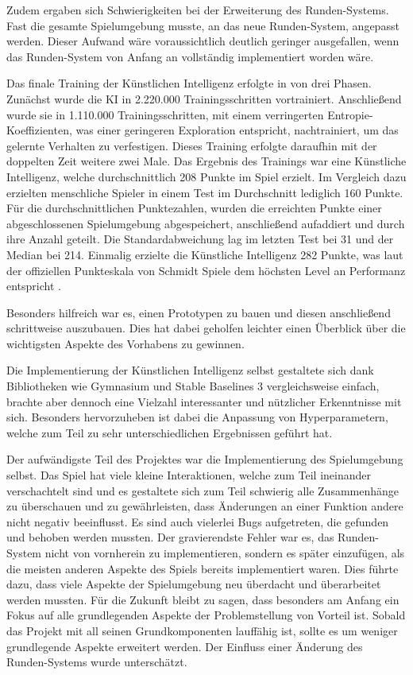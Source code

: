 Zudem ergaben sich Schwierigkeiten bei der Erweiterung des Runden-Systems. Fast die gesamte Spielumgebung musste, an das neue Runden-System, angepasst werden. Dieser Aufwand wäre voraussichtlich deutlich geringer ausgefallen, wenn das Runden-System von Anfang an vollständig implementiert worden wäre.

Das finale Training der Künstlichen Intelligenz erfolgte in von drei Phasen. Zunächst wurde die KI in 2.220.000 Trainingsschritten vortrainiert. Anschließend wurde sie in 1.110.000 Trainingsschritten, mit einem verringerten Entropie-Koeffizienten, was einer geringeren Exploration entspricht, nachtrainiert, um das gelernte Verhalten zu verfestigen. Dieses Training erfolgte daraufhin mit der doppelten Zeit weitere zwei Male. Das Ergebnis des Trainings war eine Künstliche Intelligenz, welche durchschnittlich 208 Punkte im Spiel erzielt. Im Vergleich dazu erzielten menschliche Spieler in einem Test im Durchschnitt lediglich 160 Punkte. Für die durchschnittlichen Punktezahlen, wurden die erreichten Punkte einer abgeschlossenen Spielumgebung abgespeichert, anschließend aufaddiert und durch ihre Anzahl geteilt. Die Standardabweichung lag im letzten Test bei 31 und der Median bei 214. Einmalig erzielte die Künstliche Intelligenz 282 Punkte, was laut der offiziellen Punkteskala von Schmidt Spiele dem höchsten Level an Performanz entspricht \cite{noauthor_49340_ganz_schoen_clever_anleitung_final9_nodate}.

Besonders hilfreich war es, einen Prototypen zu bauen und diesen anschließend schrittweise auszubauen. Dies hat dabei geholfen leichter einen Überblick über die wichtigsten Aspekte des Vorhabens zu gewinnen. 

Die Implementierung der Künstlichen Intelligenz selbst gestaltete sich dank Bibliotheken wie Gymnasium und Stable Baselines 3 vergleichsweise einfach, brachte aber dennoch eine Vielzahl interessanter und nützlicher Erkenntnisse mit sich. Besonders hervorzuheben ist dabei die Anpassung von Hyperparametern, welche zum Teil zu sehr unterschiedlichen Ergebnissen geführt hat. 

Der aufwändigste Teil des Projektes war die Implementierung des Spielumgebung selbst. Das Spiel hat viele kleine Interaktionen, welche zum Teil ineinander verschachtelt sind und es gestaltete sich zum Teil schwierig alle Zusammenhänge zu überschauen und zu gewährleisten, dass Änderungen an einer Funktion andere nicht negativ beeinflusst. Es sind auch vielerlei Bugs aufgetreten, die gefunden und behoben werden mussten. Der gravierendste Fehler war es, das Runden-System nicht von vornherein zu implementieren, sondern es später einzufügen, als die meisten anderen Aspekte des Spiels bereits implementiert waren. Dies führte dazu, dass viele Aspekte der Spielumgebung neu überdacht und überarbeitet werden mussten. Für die Zukunft bleibt zu sagen, dass besonders am Anfang ein Fokus auf alle grundlegenden Aspekte der Problemstellung von Vorteil ist. Sobald das Projekt mit all seinen Grundkomponenten lauffähig ist, sollte es um weniger grundlegende Aspekte erweitert werden. Der Einfluss einer Änderung des Runden-Systems wurde unterschätzt.\\

